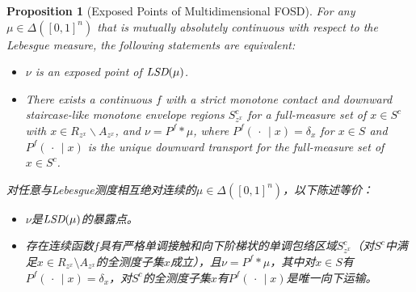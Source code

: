 \documentclass[12pt,letterpaper]{article}
\newenvironment{original}{\color{black}}{}
\newenvironment{translation}{\color{blue}}{}
\theoremstyle{plain}
\newtheorem{prop}{Proposition}
\theoremstyle{definition}
\theoremstyle{remark}
\theoremstyle{definition}
\begin{document}
\begin{prop}[Exposed Points of Multidimensional FOSD]\label{prop:fosd}
\begin{original}
For any $\mu \in \Delta([0, 1]^n)$ that is mutually absolutely continuous with respect to the Lebesgue measure, the following statements are equivalent:
\begin{itemize}
    \item[(a)] $\nu$ is an exposed point of $\emph{LSD}(\mu)$.
    \item[(b)] There exists a continuous $f$ with a strict monotone contact and downward staircase-like monotone envelope regions $S^{c}_{z^x}$ for a full-measure set of $x \in S^c$ with $x \in R_{z^x}\backslash A_{z^x}$, and $\nu = P^f * \mu$, where $P^f(\,\cdot\,\mid x) = \delta_x$ for $x \in S$ and $P^f(\,\cdot\,\mid x)$ is the unique downward transport for the full-measure set of $x \in S^c$.
\end{itemize}
\end{original}
\begin{translation}
对任意与Lebesgue测度相互绝对连续的$\mu \in \Delta([0, 1]^n)$，以下陈述等价：
\begin{itemize}
    \item[(a)] $\nu$是$\emph{LSD}(\mu)$的暴露点。
    \item[(b)] 存在连续函数$f$具有严格单调接触和向下阶梯状的单调包络区域$S^{c}_{z^x}$（对$S^c$中满足$x \in R_{z^x}\setminus A_{z^x}$的全测度子集$x$成立），且$\nu = P^f * \mu$，其中对$x \in S$有$P^f(\,\cdot\,\mid x) = \delta_x$，对$S^c$的全测度子集$x$有$P^f(\,\cdot\,\mid x)$是唯一向下运输。
\end{itemize}
\end{translation}
\end{prop}
\end{document}
